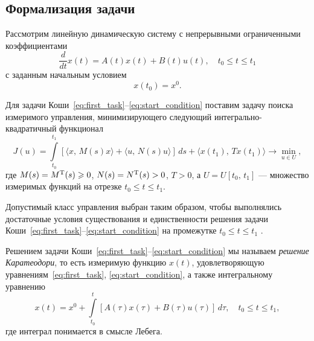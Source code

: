 \subsection{Формализация задачи}

Рассмотрим линейную динамическую систему с непрерывными ограниченными коэффициентами
\begin{equation}\label{eq:first_task}
        \frac{d}{dt}x(t) = A(t)x(t) + B(t)u(t),
        \quad
        t_0 \leqslant t \leqslant t_1
\end{equation}
с заданным начальным условием
\begin{equation}\label{eq:start_condition}
        x(t_0) = x^0.
\end{equation}

Для задачи Коши~\eqref{eq:first_task}--\eqref{eq:start_condition} поставим задачу поиска измеримого управления, минимизирующего следующий интегрально-квадратичный функционал
\begin{equation}\label{eq:functional}
        J(u)
=
        \int\limits_{t_0}^{t_1}
[
\langle
x,\,M(s)x
\rangle
+
\langle
u,\,N(s)u
\rangle
]\,ds
        +
        \langle
        x(t_1),\,Tx(t_1)
        \rangle
\to
        \min\limits_{u \in U},
\end{equation}
где $M(s) = M^\mathrm{T}(s) \geqslant 0$,
$N(s) = N^\mathrm{T}(s) > 0$,
$T > 0$,
а $U = U[t_0,\,t_1]$ --- мно\-жес\-т\-во измеримых функций на отрезке $t_0 \leqslant t \leqslant t_1$.

Допустимый класс управления выбран таким образом, чтобы выполнялись достаточные условия существования и единственности решения задачи Коши~\eqref{eq:first_task}--\eqref{eq:start_condition} на промежутке $t_0 \leqslant t \leqslant t_1$ \cite{filippov}.

\begin{remark}
        Решением задачи Коши~\eqref{eq:first_task}--\eqref{eq:start_condition} мы называем \textit{решение Каратеодори}, то есть измеримую функцию $x(t)$, удовлетворяющую уравнениям~\eqref{eq:first_task}, \eqref{eq:start_condition}, а также интегральному уравнению
$$
        x(t) = x^0 + \int\limits_{t_0}^{t} [A(\tau)x(\tau) + B(\tau)u(\tau)]\,d\tau,
        \quad
        t_0\leqslant t \leqslant t_1,
$$ 
        где интеграл понимается в смысле Лебега.
\end{remark}